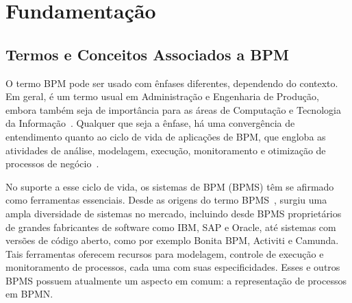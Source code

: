 \documentclass[12pt]{article}
\begin{document}



\section{Fundamentação}\label{sec:bpm}
\subsection{Termos e Conceitos Associados a BPM} 

O termo BPM pode ser usado com ênfases diferentes, dependendo do contexto. Em geral, é um termo usual em Administração e Engenharia de Produção, embora também seja de importância para as áreas de Computação e Tecnologia da Informação~\cite{sbqs2015:bpms}. Qualquer que seja a ênfase, há uma convergência de entendimento quanto ao ciclo de vida de aplicações de BPM, que engloba as atividades de análise, modelagem, execução, monitoramento e otimização de processos de negócio~\cite{ABPMP}. 

No suporte a esse ciclo de vida, os sistemas de BPM (BPMS) têm se afirmado como ferramentas essenciais. Desde as origens do termo BPMS~\cite{thirdwave:2003}, surgiu uma ampla diversidade de sistemas no mercado, incluindo desde BPMS proprietários de grandes fabricantes de software como IBM, SAP e Oracle, até sistemas com versões de código aberto, como por exemplo Bonita BPM, Activiti e Camunda. Tais ferramentas oferecem recursos para modelagem, controle de execução e monitoramento de processos, cada uma com suas especificidades. Esses e outros BPMS possuem atualmente um aspecto em comum: a representação de processos em BPMN.
\end{document}
